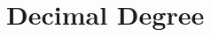 \hypertarget{group___e_g_x_math-_angle_conversions-_decimal_degree}{}\section{Decimal Degree}
\label{group___e_g_x_math-_angle_conversions-_decimal_degree}
